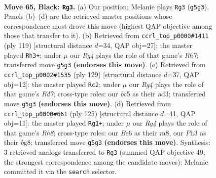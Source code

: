 \documentclass[11pt]{article}
\begin{document}
\clearpage

\begin{figure}[p]\centering
\begin{subfigure}{0.46\textwidth}\centering
\resizebox{\linewidth}{!}{%
\newchessgame
\chessboard[
  setfen={2k5/8/4b3/2B3r1/PK6/1P3B1p/1R5N/8 b - - 9 65},
  showmover=false,
  pgfstyle=straightmove, color=movearrow, markmove={g5-g3}
]}
\caption{}
\end{subfigure}\hfill
\begin{subfigure}{0.46\textwidth}\centering
\resizebox{\linewidth}{!}{%
\newchessgame
\chessboard[
  setfen={8/8/5p2/2k1b3/8/R1PK4/P3B2r/8 b - - 0 60},
  showmover=false,
  pgfstyle=straightmove, color=movearrow, markmove={h2-h3}
]}
\caption{}
\end{subfigure}
\\[4pt]
\begin{subfigure}{0.46\textwidth}\centering
\resizebox{\linewidth}{!}{%
\newchessgame
\chessboard[
  setfen={8/8/5k2/5p2/2B4b/3NPK2/3r1P2/8 b - - 11 65},
  showmover=false,
  pgfstyle=straightmove, color=movearrow, markmove={d2-c2}
]}
\caption{}
\end{subfigure}\hfill
\begin{subfigure}{0.46\textwidth}\centering
\resizebox{\linewidth}{!}{%
\newchessgame
\chessboard[
  setfen={R5B1/7P/2p5/5PK1/1k6/p7/1b6/7r b - - 0 63},
  showmover=false,
  pgfstyle=straightmove, color=movearrow, markmove={h1-g1}
]}
\caption{}
\end{subfigure}
\caption{\textbf{Move 65, Black: \texttt{Rg3}.} (a) Our position; Melanie plays \texttt{Rg3} (\texttt{g5g3}). Panels (b)--(d) are the retrieved master positions whose correspondence most drove this move (highest QAP objective among those that transfer to it). (b) Retrieved from \texttt{ccrl\_top\_p0000\#1411} (ply 119) [structural distance $d$=34, QAP obj=27]: the master played \texttt{Rh3+}; under $\mu$ our \emph{Rg4} plays the role of that game's \emph{Rh7}; transferred move \texttt{g5g3} \textbf{(endorses this move)}. (c) Retrieved from \texttt{ccrl\_top\_p0002\#1535} (ply 129) [structural distance $d$=37, QAP obj=12]: the master played \texttt{Rc2}; under $\mu$ our \emph{Rg4} plays the role of that game's \emph{Rd7}; cross-type roles: our \emph{b}c5 as their \emph{n}d3; transferred move \texttt{g5g3} \textbf{(endorses this move)}. (d) Retrieved from \texttt{ccrl\_top\_p0000\#661} (ply 125) [structural distance $d$=41, QAP obj=11]: the master played \texttt{Rg1+}; under $\mu$ our \emph{Rg4} plays the role of that game's \emph{Rh8}; cross-type roles: our \emph{B}e6 as their \emph{r}a8, our \emph{P}h3 as their \emph{b}g8; transferred move \texttt{g5g3} \textbf{(endorses this move)}. Synthesis: 3 retrieved analogs transferred to \texttt{Rg3} (summed QAP objective 49, the strongest correspondence among the candidate moves); Melanie committed it via the \texttt{search} selector.}
\label{fig:thought-m129}
\end{figure}
\end{document}
